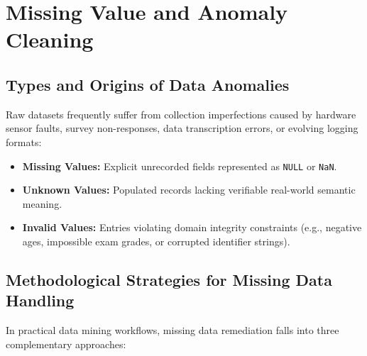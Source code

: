 \section{Missing Value and Anomaly Cleaning}

\subsection{Types and Origins of Data Anomalies}
Raw datasets frequently suffer from collection imperfections caused by hardware sensor faults, survey non-responses, data transcription errors, or evolving logging formats:
\begin{itemize}
    \item \textbf{Missing Values:} Explicit unrecorded fields represented as \texttt{NULL} or \texttt{NaN}.
    \item \textbf{Unknown Values:} Populated records lacking verifiable real-world semantic meaning.
    \item \textbf{Invalid Values:} Entries violating domain integrity constraints (e.g., negative ages, impossible exam grades, or corrupted identifier strings).
\end{itemize}

\subsection{Methodological Strategies for Missing Data Handling}
In practical data mining workflows, missing data remediation falls into three complementary approaches:


